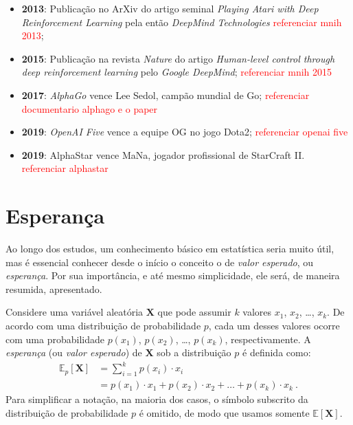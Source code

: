 \documentclass{article}
\newcommand*{\RandomVariable}[1]{\mathbf{#1}}
\newcommand*{\ExpectedValue}{\mathbb{E}}
\begin{document}
            \begin{itemize}
                \item \textbf{2013}: Publicação no ArXiv do artigo seminal \emph{Playing Atari with Deep Reinforcement Learning} pela então \emph{DeepMind Technologies} \textcolor{red}{referenciar mnih 2013};
                \item \textbf{2015}: Publicação na revista \emph{Nature} do artigo \emph{Human-level control through deep reinforcement learning} pelo \emph{Google DeepMind}; \textcolor{red}{referenciar mnih 2015}
                \item \textbf{2017}: \emph{AlphaGo} vence Lee Sedol, campão mundial de Go;  \textcolor{red}{referenciar documentario alphago e o paper}
                \item \textbf{2019}: \emph{OpenAI Five} vence a equipe OG no jogo Dota2;  \textcolor{red}{referenciar openai five}
                \item \textbf{2019}: AlphaStar vence MaNa, jogador profissional de StarCraft II. \textcolor{red}{referenciar alphastar}
            \end{itemize}

    \section{Esperança}
            
        Ao longo dos estudos, um conhecimento básico em estatística seria muito útil, mas é essencial conhecer desde o início o conceito o de \emph{valor esperado}, ou \emph{esperança}. Por sua importância, e até mesmo simplicidade, ele será, de maneira resumida, apresentado.
        
        Considere uma variável aleatória $\RandomVariable{X}$ que pode assumir $k$ valores $x_1$, $x_2$, \dots, $x_k$. De acordo com uma distribuição de probabilidade $p$, cada um desses valores ocorre com uma probabilidade $p(x_1)$, $p(x_2)$, \dots, $p(x_k)$, respectivamente. A \emph{esperança} (ou \emph{valor esperado}) de $\RandomVariable{X}$ sob a distribuição $p$ é definida como:
        \begin{equation}
        \begin{aligned}
            \label{eq:state-value}
            \ExpectedValue_p[\RandomVariable{X}] & = \sum_{i=1}^k p(x_i) \cdot x_i \\
            & = p(x_1) \cdot x_1 + p(x_2) \cdot x_2 + \dots + p(x_k) \cdot x_k\ .
        \end{aligned}
        \end{equation}
        Para simplificar a notação, na maioria dos casos, o símbolo subscrito da distribuição de probabilidade $p$ é omitido, de modo que usamos somente $\ExpectedValue[\RandomVariable{X}]$.
\end{document}
